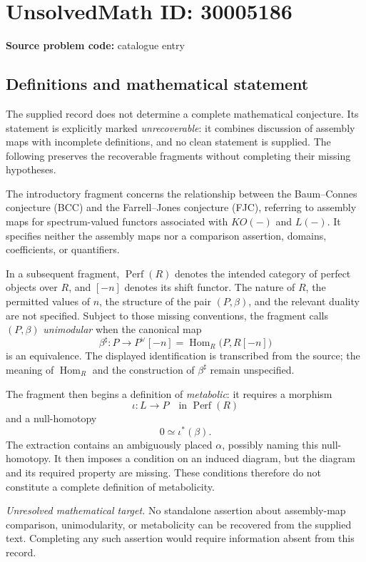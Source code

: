 \documentclass[11pt]{article}
\begin{document}
\section*{UnsolvedMath ID: 30005186}
\textbf{Source problem code:} catalogue entry
\subsection{Definitions and mathematical statement}
The supplied record does not determine a complete mathematical conjecture. Its statement is explicitly marked \emph{unrecoverable}: it combines discussion of assembly maps with incomplete definitions, and no clean statement is supplied. The following preserves the recoverable fragments without completing their missing hypotheses.

The introductory fragment concerns the relationship between the Baum--Connes conjecture (BCC) and the Farrell--Jones conjecture (FJC), referring to assembly maps for spectrum-valued functors associated with \(KO(-)\) and \(L(-)\). It specifies neither the assembly maps nor a comparison assertion, domains, coefficients, or quantifiers.

In a subsequent fragment, \(\operatorname{Perf}(R)\) denotes the intended category of perfect objects over \(R\), and \([-n]\) denotes its shift functor. The nature of \(R\), the permitted values of \(n\), the structure of the pair \((P,\beta)\), and the relevant duality are not specified. Subject to those missing conventions, the fragment calls \((P,\beta)\) \emph{unimodular} when the canonical map
\[
\beta^{\sharp}\colon P\longrightarrow P^{\vee}[-n]
=\operatorname{Hom}_{R}\bigl(P,R[-n]\bigr)
\]
is an equivalence. The displayed identification is transcribed from the source; the meaning of \(\operatorname{Hom}_{R}\) and the construction of \(\beta^{\sharp}\) remain unspecified.

The fragment then begins a definition of \emph{metabolic}: it requires a morphism
\[
\iota\colon L\longrightarrow P
\quad\text{in }\operatorname{Perf}(R)
\]
and a null-homotopy
\[
0\simeq\iota^{*}(\beta).
\]
The extraction contains an ambiguously placed \(\alpha\), possibly naming this null-homotopy. It then imposes a condition on an induced diagram, but the diagram and its required property are missing. These conditions therefore do not constitute a complete definition of metabolicity.

\emph{Unresolved mathematical target.} No standalone assertion about assembly-map comparison, unimodularity, or metabolicity can be recovered from the supplied text. Completing any such assertion would require information absent from this record.
\end{document}
